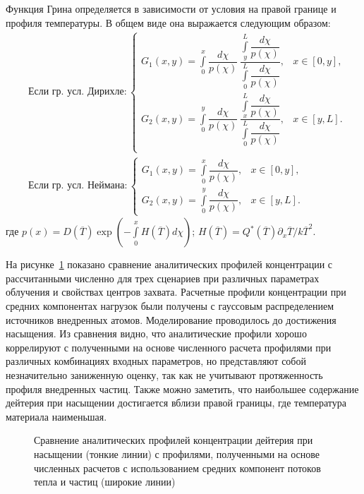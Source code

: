 Функция Грина определяется в зависимости от условия на правой границе и профиля температуры. В общем виде она выражается следующим образом:
\begin{subequations}
	\begin{align}
		 & \text{Если гр. усл. Дирихле}:
		\begin{cases}
			G_1(x,y)=\int\limits_0^x\dfrac{d\chi}{p(\chi)}\,\dfrac{\int\limits_y^L\dfrac{d\chi}{p(\chi)}}{\int\limits_0^L\dfrac{d\chi}{p(\chi)}}, & x\in[0,y], \\[25pt]
			G_2(x,y)=\int\limits_0^y\dfrac{d\chi}{p(\chi)}\,\dfrac{\int\limits_x^L\dfrac{d\chi}{p(\chi)}}{\int\limits_0^L\dfrac{d\chi}{p(\chi)}}, & x\in[y,L]. \\
		\end{cases} \\[10pt]
		 & \text{Если гр. усл. Неймана}:
		\begin{cases}
			G_1(x,y)=\int\limits_0^x\dfrac{d\chi}{p(\chi)}, & x\in[0,y], \\[10pt]
			G_2(x,y)=\int\limits_0^y\dfrac{d\chi}{p(\chi)}, & x\in[y,L].
		\end{cases}
	\end{align}
\end{subequations}
где $p(x)=D(\overline{T})\exp\left(-\int\limits_0^x H(\overline{T})d\chi\right)$; $H(\overline{T})=Q^*(\overline{T})\partial_x \overline{T}/k\overline{T}^2$. 

На рисунке~\cref{fig:retention_saturation} показано сравнение аналитических профилей концентрации с рассчитанными численно для трех сценариев при различных параметрах облучения и свойствах центров захвата. Расчетные профили концентрации при средних компонентах нагрузок были получены с гауссовым распределением источников внедренных атомов. Моделирование проводилось до достижения насыщения. Из сравнения видно, что аналитические профили хорошо коррелируют с полученными на основе численного расчета профилями при различных комбинациях входных параметров, но представляют собой незначительно заниженную оценку, так как не учитывают протяженность профиля внедренных частиц. Также можно заметить, что наибольшее содержание дейтерия при насыщении достигается вблизи правой границы, где температура материала наименьшая.
\begin{figure}[ht]
	\caption{Сравнение аналитических профилей концентрации дейтерия при насыщении (тонкие линии) с профилями, полученными на основе численных расчетов с использованием средних компонент потоков тепла и частиц (широкие линии)}\label{fig:retention_saturation}
\end{figure}


